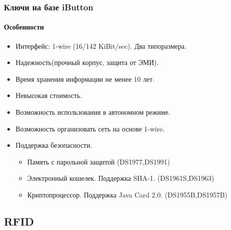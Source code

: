 \begin{frame}
\frametitle{Ключи на базе iButton}
\framesubtitle{Особенности}
\begin{itemize}
    \item Интерфейс: 1-wire (16/142 KiBit/sec). Два типоразмера.
    \item Надежность(прочный корпус, защита от ЭМИ).
    \item Время хранения информации не менее 10 лет.
    \item Невысокая стоимость.
    \item Возможность использования в автономном режиме.
    \item Возможность организовать сеть на основе 1-wire.
    \item Поддержка безопасности.
    \begin{itemize}
        \item Память с парольной защитой (DS1977,DS1991)
        \item Электронный кошелек. Поддержка SHA-1. (DS1961S,DS1963)
        \item Криптопроцессор. Поддержка Java Card 2.0. (DS1955B,DS1957B)
    \end{itemize}
\end{itemize}
\end{frame}


\subsection{RFID}


